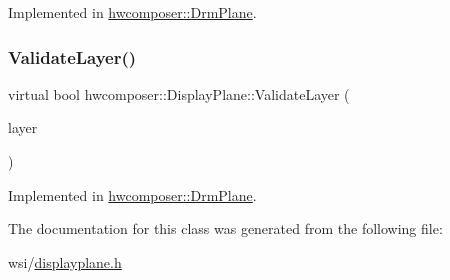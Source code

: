 Implemented in \mbox{\hyperlink{classhwcomposer_1_1DrmPlane_aed0ac04d949d6457dd638e121c3618d5}{hwcomposer\+::\+Drm\+Plane}}.

\mbox{\label{classhwcomposer_1_1DisplayPlane_a138f43531c6320ad6622ea48ab86df13}} 
\subsubsection{\texorpdfstring{Validate\+Layer()}{ValidateLayer()}}
{\footnotesize\ttfamily virtual bool hwcomposer\+::\+Display\+Plane\+::\+Validate\+Layer (\begin{DoxyParamCaption}\item[{const \mbox{\hyperlink{structhwcomposer_1_1OverlayLayer}{Overlay\+Layer}} $\ast$}]{layer }\end{DoxyParamCaption})\hspace{0.3cm}{\ttfamily [pure virtual]}}



Implemented in \mbox{\hyperlink{classhwcomposer_1_1DrmPlane_ad07df42def289d2dbbf9be4ad6748db8}{hwcomposer\+::\+Drm\+Plane}}.



The documentation for this class was generated from the following file\+:\begin{DoxyCompactItemize}
\item 
wsi/\mbox{\hyperlink{displayplane_8h}{displayplane.\+h}}\end{DoxyCompactItemize}
